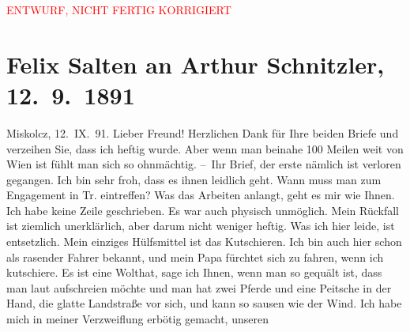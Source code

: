 
\begin{center}
            \textcolor{red}{ENTWURF, NICHT FERTIG KORRIGIERT}
                      \end{center}
            
         
         \renewcommand{\erwaehntePersonen}{Personen: Philipp Salzmann, Michael Emil Salzmann}
         \renewcommand{\erwaehnteOrte}{Orte: Café Kremser, Italien, Miskolc, Opava, Uppony, Upponyi-szoros, Wien}
         \renewcommand{\erwaehnteWerke}{}
               \section[Felix Salten an Arthur Schnitzler, 12. 9. 1891]{ Felix Salten an Arthur Schnitzler, 12. 9. 1891}\nopagebreak{}\rehead{ }\begin{ledgroupsized}[t]{13cm}\normalsize\beginnumbering \toendnotes[C]{\smallbreak\pagebreak[2]} 
\toendnotes[C]{\smallbreak}\pstart
           {\pb} Miskolcz, 12. IX. 91.
               \pend
           \pstart
           Lieber Freund! Herzlichen Dank für Ihre beiden Briefe und verzeihen
               Sie, dass ich heftig wurde. Aber wenn man beinahe 100 Meilen weit von Wien ist fühlt man sich so ohnmächtig. \pend
           \pstart
           – Ihr Brief, der erste nämlich ist verloren gegangen. Ich bin sehr froh, dass es
               ihnen leidlich geht. Wann muss man zum Engagement in Tr. eintreffen? Was das Arbeiten anlangt, geht es mir wie Ihnen. Ich habe
               keine Zeile geschrieben. Es war auch physisch unmöglich. Mein Rückfall ist ziemlich
               unerklärlich, aber darum nicht weniger heftig. Was ich hier leide, ist entsetzlich.
               Mein einziges Hülfsmittel ist das Kutschieren. Ich bin auch hier schon als rasender
               Fahrer bekannt, und mein Papa fürchtet sich zu fahren, wenn ich kutschiere. Es ist eine Wolthat, sage
               ich Ihnen, wenn man so gequält ist, dass man laut aufschreien möchte und man hat zwei
               Pferde und eine Peitsche in der Hand, die glatte Landstraße vor sich, und kann so
               sausen wie der Wind. Ich habe mich in meiner Verzweiflung erbötig gemacht, unseren

\end{ledgroupsized}
